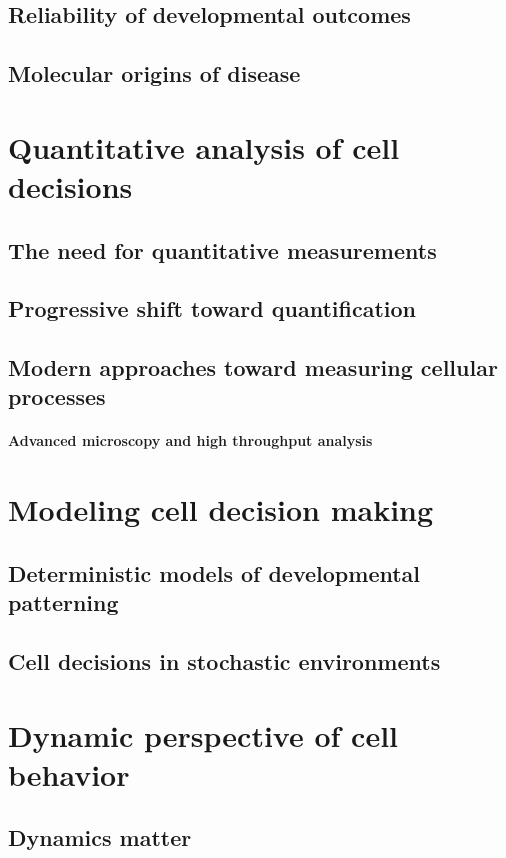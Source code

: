 	\subsection{Reliability of developmental outcomes}	
	\subsection{Molecular origins of disease}

\section{Quantitative analysis of cell decisions}

	\subsection{The need for quantitative measurements}	
	\subsection{Progressive shift toward quantification}
	\subsection{Modern approaches toward measuring cellular processes}
		\paragraph{Advanced microscopy and high throughput analysis}
	
\section{Modeling cell decision making}

	\subsection{Deterministic models of developmental patterning}	
	\subsection{Cell decisions in stochastic environments}

\section{Dynamic perspective of cell behavior}

	\subsection{Dynamics matter}
